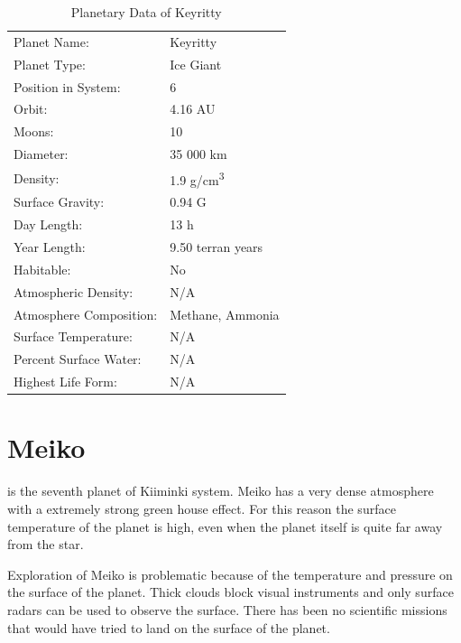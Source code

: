 \documentclass{tufte-book}
\begin{document}
\bigskip
\begin{table}
\begin{minipage}{\textwidth}
\begin{center}
\begin{tabular}{ll}
\toprule
Planet Name: & Keyritty \\
Planet Type: & Ice Giant \\
Position in System: & 6 \\
Orbit: & 4.16 AU \\
Moons: & 10 \\
Diameter: & 35 000 km \\
Density: & 1.9 g/cm\textsuperscript{3} \\
Surface Gravity: & 0.94 G \\
Day Length: & 13 h \\
Year Length: & 9.50 terran years \\
Habitable: & No \\
\quad Atmospheric Density: & N/A \\
\quad Atmosphere Composition: & Methane, Ammonia \\
\quad Surface Temperature: & N/A \\
\quad Percent Surface Water: & N/A \\
\quad Highest Life Form: & N/A \\

\bottomrule
\end{tabular}
\end{center}
\end{minipage}
\caption{Planetary Data of Keyritty}
\end{table}


\section{Meiko}

 is the seventh planet of Kiiminki system. Meiko has a very
dense atmosphere with a extremely strong green house effect. For this reason
the surface temperature of the planet is high, even when the planet itself is
quite far away from the star.

Exploration of Meiko is problematic because of the temperature and pressure on
the surface of the planet. Thick clouds block visual instruments and only
surface radars can be used to observe the surface. There has been no
scientific missions that would have tried to land on the surface of the planet.
\end{document}
